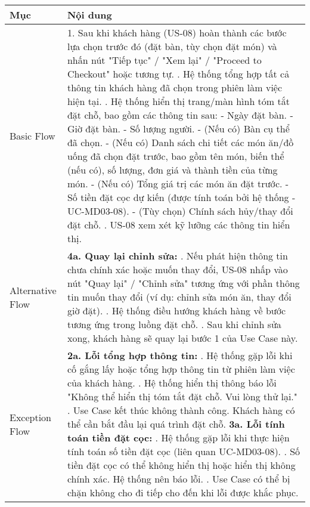 \begin{longtable}{|m{4cm}|p{11cm}|}
\hline
\textbf{Mục} & \textbf{Nội dung} \\
\hline
Basic Flow & 1. Sau khi khách hàng (US-08) hoàn thành các bước lựa chọn trước đó (đặt bàn, tùy chọn đặt món) và nhấn nút "Tiếp tục" / "Xem lại" / "Proceed to Checkout" hoặc tương tự. \newline 2. Hệ thống tổng hợp tất cả thông tin khách hàng đã chọn trong phiên làm việc hiện tại. \newline 3. Hệ thống hiển thị trang/màn hình tóm tắt đặt chỗ, bao gồm các thông tin sau: \newline    - Ngày đặt bàn. \newline    - Giờ đặt bàn. \newline    - Số lượng người. \newline    - (Nếu có) Bàn cụ thể đã chọn. \newline    - (Nếu có) Danh sách chi tiết các món ăn/đồ uống đã chọn đặt trước, bao gồm tên món, biến thể (nếu có), số lượng, đơn giá và thành tiền của từng món. \newline    - (Nếu có) Tổng giá trị các món ăn đặt trước. \newline    - Số tiền đặt cọc dự kiến (được tính toán bởi hệ thống - UC-MD03-08). \newline    - (Tùy chọn) Chính sách hủy/thay đổi đặt chỗ. \newline 4. US-08 xem xét kỹ lưỡng các thông tin hiển thị. \\
\hline
Alternative Flow & \textbf{4a. Quay lại chỉnh sửa:} \newline    1. Nếu phát hiện thông tin chưa chính xác hoặc muốn thay đổi, US-08 nhấp vào nút "Quay lại" / "Chỉnh sửa" tương ứng với phần thông tin muốn thay đổi (ví dụ: chỉnh sửa món ăn, thay đổi giờ đặt). \newline    2. Hệ thống điều hướng khách hàng về bước tương ứng trong luồng đặt chỗ. \newline    3. Sau khi chỉnh sửa xong, khách hàng sẽ quay lại bước 1 của Use Case này. \\
\hline
Exception Flow & \textbf{2a. Lỗi tổng hợp thông tin:} \newline    1. Hệ thống gặp lỗi khi cố gắng lấy hoặc tổng hợp thông tin từ phiên làm việc của khách hàng. \newline    2. Hệ thống hiển thị thông báo lỗi "Không thể hiển thị tóm tắt đặt chỗ. Vui lòng thử lại." \newline    3. Use Case kết thúc không thành công. Khách hàng có thể cần bắt đầu lại quá trình đặt chỗ. \newline \textbf{3a. Lỗi tính toán tiền đặt cọc:} \newline    1. Hệ thống gặp lỗi khi thực hiện tính toán số tiền đặt cọc (liên quan UC-MD03-08). \newline    2. Số tiền đặt cọc có thể không hiển thị hoặc hiển thị không chính xác. Hệ thống nên báo lỗi. \newline    3. Use Case có thể bị chặn không cho đi tiếp cho đến khi lỗi được khắc phục. \\

\end{longtable}
